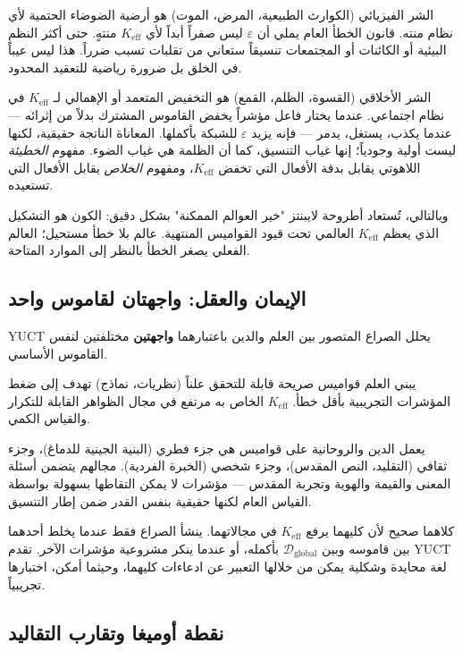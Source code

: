 \documentclass[12pt,a4paper]{article}
\begin{document}
	الشر الفيزيائي (الكوارث الطبيعية، المرض، الموت) هو أرضية الضوضاء الحتمية لأي نظام منته. قانون الخطأ العام يملي أن \(\varepsilon\) ليس صفراً أبداً لأي \(K_{\mathrm{eff}}\) منتهٍ. حتى أكثر النظم البيئية أو الكائنات أو المجتمعات تنسيقاً ستعاني من تقلبات تسبب ضرراً. هذا ليس عيباً في الخلق بل ضرورة رياضية للتعقيد المحدود.
	
	الشر الأخلاقي (القسوة، الظلم، القمع) هو التخفيض المتعمد أو الإهمالي لـ \(K_{\mathrm{eff}}\) في نظام اجتماعي. عندما يختار فاعل مؤشراً يخفض القاموس المشترك بدلاً من إثرائه — عندما يكذب، يستغل، يدمر — فإنه يزيد \(\varepsilon\) للشبكة بأكملها. المعاناة الناتجة حقيقية، لكنها ليست أولية وجودياً؛ إنها غياب التنسيق، كما أن الظلمة هي غياب الضوء. مفهوم \emph{الخطيئة} اللاهوتي يقابل بدقة الأفعال التي تخفض \(K_{\mathrm{eff}}\)، ومفهوم \emph{الخلاص} يقابل الأفعال التي تستعيده.
	
	وبالتالي، تُستعاد أطروحة لايبنتز "خير العوالم الممكنة" بشكل دقيق: الكون هو التشكيل الذي يعظم \(K_{\mathrm{eff}}\) العالمي تحت قيود القواميس المنتهية. عالم بلا خطأ مستحيل؛ العالم الفعلي يصغر الخطأ بالنظر إلى الموارد المتاحة.
	
	\subsection{الإيمان والعقل: واجهتان لقاموس واحد}
	
	YUCT يحلل الصراع المتصور بين العلم والدين باعتبارهما \textbf{واجهتين} مختلفتين لنفس القاموس الأساسي.
	
	يبني العلم قواميس صريحة قابلة للتحقق علناً (نظريات، نماذج) تهدف إلى ضغط المؤشرات التجريبية بأقل خطأ. \(K_{\mathrm{eff}}\) الخاص به مرتفع في مجال الظواهر القابلة للتكرار والقياس الكمي.
	
	يعمل الدين والروحانية على قواميس هي جزء فطري (البنية الجينية للدماغ)، وجزء ثقافي (التقليد، النص المقدس)، وجزء شخصي (الخبرة الفردية). مجالهم يتضمن أسئلة المعنى والقيمة والهوية وتجربة المقدس — مؤشرات لا يمكن التقاطها بسهولة بواسطة القياس العام لكنها حقيقية بنفس القدر ضمن إطار التنسيق.
	
	كلاهما صحيح لأن كليهما يرفع \(K_{\mathrm{eff}}\) في مجالاتهما. ينشأ الصراع فقط عندما يخلط أحدهما بين قاموسه وبين \(\mathcal{D}_{\text{global}}\) بأكمله، أو عندما ينكر مشروعية مؤشرات الآخر. تقدم YUCT لغة محايدة وشكلية يمكن من خلالها التعبير عن ادعاءات كليهما، وحيثما أمكن، اختبارها تجريبياً.
	
	\subsection{نقطة أوميغا وتقارب التقاليد}
	
\end{document}
